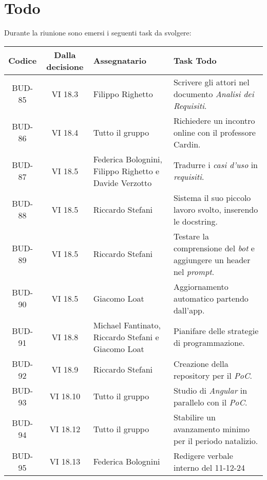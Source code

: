 
\section{Todo}

Durante la riunione sono emersi i seguenti task da svolgere:

\vspace{0.5cm}

\begin{table}[htbp]
\centering
{}
\begin{tabular}{|c|c|p{}|p{}|}
    \hline
    \rowcolor[gray]{0.75}
    \textbf{Codice} & \textbf{Dalla decisione} & \textbf{Assegnatario} & \textbf{Task Todo} \\
    \hline
    BUD-85 & VI 18.3 & Filippo Righetto & Scrivere gli attori nel documento \emph{Analisi dei Requisiti}. \\
    \hline
    BUD-86 & VI 18.4 & Tutto il gruppo & Richiedere un incontro online con il professore Cardin. \\
    \hline
    BUD-87 & VI 18.5 & Federica Bolognini, Filippo Righetto e Davide Verzotto & Tradurre i \emph{casi d'uso} in \emph{requisiti}. \\
    \hline
    BUD-88 & VI 18.5 & Riccardo Stefani & Sistema il suo piccolo lavoro svolto, inserendo le docstring. \\
    \hline
    BUD-89 & VI 18.5 & Riccardo Stefani & Testare la comprensione del \emph{bot} e aggiungere un header nel \emph{prompt}. \\
    \hline
    BUD-90 & VI 18.5 & Giacomo Loat & Aggiornamento automatico partendo dall'app. \\
    \hline
    BUD-91 & VI 18.8 & Michael Fantinato, Riccardo Stefani e Giacomo Loat & Pianifare delle strategie di programmazione.\\
    \hline
    BUD-92 & VI 18.9 & Riccardo Stefani & Creazione della repository per il \emph{PoC}.\\
    \hline
    BUD-93 & VI 18.10 & Tutto il gruppo & Studio di \emph{Angular} in parallelo con il \emph{PoC}. \\
    \hline
    BUD-94 & VI 18.12 & Tutto il gruppo  & Stabilire un avanzamento minimo per il periodo natalizio.\\
    \hline
    BUD-95 & VI 18.13 & Federica Bolognini  & Redigere verbale interno del 11-12-24\\
\end{tabular}
\end{table}